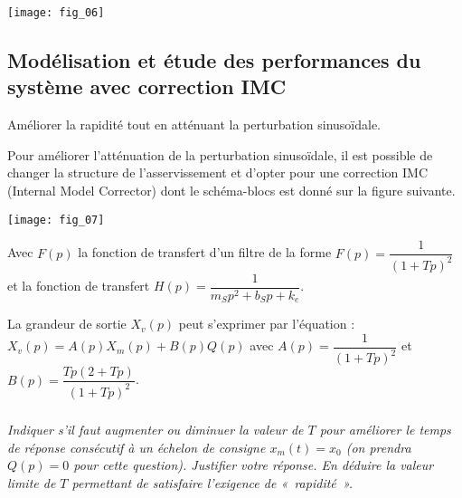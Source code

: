 \begin{multicols}{2}
\begin{center}
\texttt{[image: fig\_06]}
\end{center}



\subsection*{Modélisation et étude des performances du système avec correction IMC}

\begin{obj}
Améliorer la rapidité tout en atténuant la perturbation sinusoïdale.
\end{obj}

Pour améliorer l’atténuation de la perturbation sinusoïdale, il est possible de changer la
structure de l’asservissement et d’opter pour une correction IMC (Internal Model Corrector)
dont le schéma-blocs est donné sur la figure suivante.

\begin{center}
\texttt{[image: fig\_07]}
\end{center}

Avec $F(p)$ la fonction de transfert d’un filtre de la forme $F(p) = \dfrac{1}{\left(1+Tp\right)^2}$ et la fonction de
transfert $H(p) =\dfrac{1}{m_S p^2 + b_S p + k_e}$.



La grandeur de sortie $X_v(p)$ peut s’exprimer par l’équation : $X_v(p) = A(p)X_m(p) + B(p)Q(p)$ avec 
$A(p) = \dfrac{1}{\left(1+Tp\right)^2}$ et $B(p)=\dfrac{Tp\left(2+Tp \right)}{\left(1+Tp\right)^2}$.



\subparagraph{}\textit{Indiquer s’il faut augmenter ou diminuer la valeur de $T$ pour améliorer le temps de réponse
consécutif à un échelon de consigne $x_m(t) = x_0$ (on prendra $Q(p) = 0$ pour cette question).
Justifier votre réponse. En déduire la valeur limite de $T$ permettant de satisfaire l’exigence de
«~rapidité~».}
\ifprof
\begin{corrige}
%
%
%
%
%
%


\end{corrige}
\end{multicols}
